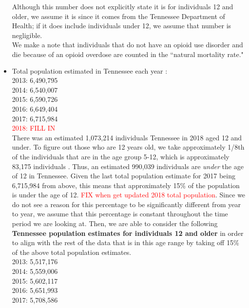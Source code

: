 \documentclass[12pt]{article}
\begin{document}
\begin{itemize}
Although this number does not explicitly state it is for individuals 12 and older, we assume it is since it comes from the Tennessee Department of Health; if it does include individuals under 12, we assume that number is negligible. \\

We make a note that individuals that do not have an opioid use disorder and die because of an opioid overdose are counted in the ``natural mortality rate." 




\item Total population estimated in Tennessee each year \cite{USCensus}: \\
2013: 6,490,795 \\
2014: 6,540,007 \\
2015: 6,590,726 \\
2016: 6,649,404 \\
2017: 6,715,984 \\
\textcolor{red}{2018: FILL IN} \\

There was an estimated 1,073,214 individuals Tennessee in 2018 aged 12 and under. To figure out those who are 12 years old, we take approximately 1/8th of the individuals that are in the age group 5-12, which is approximately 83,175 individuals \cite{DOHHS}. Thus, an estimated 990,039 individuals are \emph{under} the age of 12 in Tennessee. Given the last total population estimate for 2017 being 6,715,984 from above, this means that approximately 15\% of the population is under the age of 12. \textcolor{red}{FIX when get updated 2018 total population}. Since we do not see a reason for this percentage to be significantly different from year to year, we assume that this percentage is constant throughout the time period we are looking at. Then, we are able to consider the following \textbf{Tennessee population estimates for individuals 12 and older} in order to align with the rest of the data that is in this age range by taking off 15\% of the above total population estimates.  \\
2013: 5,517,176 \\
2014: 5,559,006 \\
2015: 5,602,117 \\
2016: 5,651,993 \\
2017: 5,708,586 \\


\end{itemize}
\end{document}
